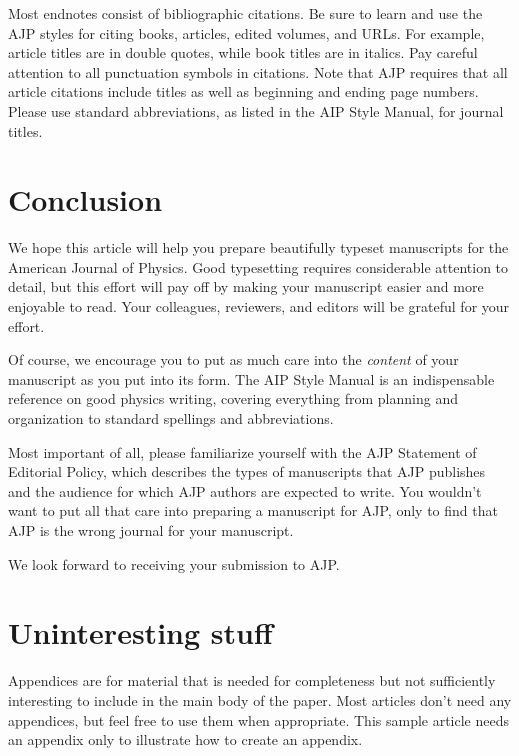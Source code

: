 \documentclass[prb,preprint]{revtex4-2}
\begin{document}
Most endnotes consist of bibliographic citations.\cite{noBIBTeX}  Be sure 
to learn and use the AJP styles for citing books,\cite{latexbook} 
articles,\cite{dyson} edited volumes,\cite{examplevolume} and
URLs.\cite{latexsite}  For example, article titles are in double quotes, 
while book titles are in italics. Pay careful attention to all punctuation 
symbols in citations.  Note that AJP requires that all article citations 
include titles as well as beginning and ending page numbers.
Please use standard abbreviations, as listed in the AIP Style 
Manual,\cite{AIPstylemanual} for journal titles.


\section{Conclusion}

We hope this article will help you prepare beautifully typeset
manuscripts for the American Journal of Physics.  Good typesetting requires
considerable attention to detail, but this effort will pay off by making your
manuscript easier and more enjoyable to read.  Your colleagues, reviewers, 
and editors will be grateful for your effort.

Of course, we encourage you to put as much care into the \textit{content} 
of your manuscript as you put into its form.  The AIP Style 
Manual\cite{AIPstylemanual} is an indispensable reference on good physics 
writing, covering everything from planning and organization to standard 
spellings and abbreviations.

Most important of all, please familiarize yourself with the AJP Statement
of Editorial Policy,\cite{editorsite} which describes the types of manuscripts 
that AJP publishes and the audience for which AJP authors are expected to write.
You wouldn't want to put all that care into preparing a manuscript for AJP,
only to find that AJP is the wrong journal for your manuscript.

We look forward to receiving your submission to AJP.


\appendix*   %

\section{Uninteresting stuff}

Appendices are for material that is needed for completeness but
not sufficiently interesting to include in the main body of the paper.  Most
articles don't need any appendices, but feel free to use them when
appropriate.  This sample article needs an appendix only to illustrate how 
to create an appendix.
\end{document}
